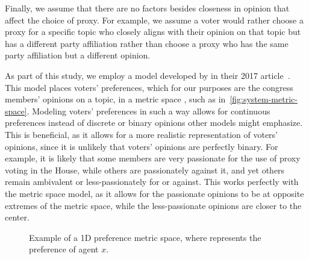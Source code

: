 Finally, we assume that there are no factors besides closeness in opinion that affect
the choice of proxy.
For example, we assume a voter would rather choose a proxy for a specific topic who
closely aligns with their opinion on that topic but has a different party affiliation
rather than choose a proxy who has the same party affiliation but a different opinion.


As part of this study, we employ a model developed by  in
their 2017 article~\cite{Cohensius2017}.
This model places voters' preferences, which for our purposes are the congress
members' opinions on a topic, in a metric space \systemspace, such as
in~\autoref{fig:system-metric-space}.
Modeling voters' preferences in such a way allows for continuous preferences instead of
discrete or binary opinions other models might emphasize.
This is beneficial, as it allows for a more realistic representation of voters'
opinions, since it is unlikely that voters' opinions are perfectly binary.
For example, it is likely that some members are very passionate for the
use of proxy voting in the House, while others are passionately against it, and yet
others remain ambivalent or less-passionately for or against.
This works perfectly with the metric space model, as it allows for the passionate
opinions to be at opposite extremes of the metric space, while the less-passionate
opinions are closer to the center.

\begin{figure}[htbp]
    \centering

    \caption{Example of a 1D preference metric space, where  represents the
    preference of agent $x$.}
    \label{fig:system-metric-space}
\end{figure}

